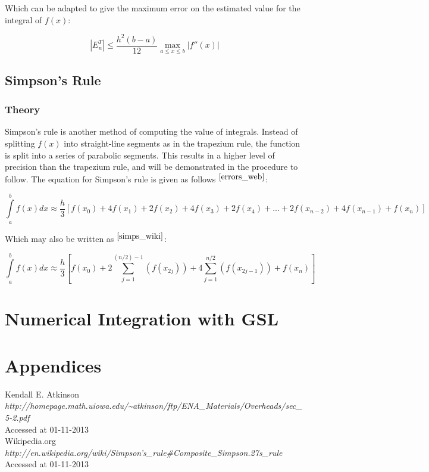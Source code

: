 \documentclass[pdf,color]{UoBnote}
\begin{document}
			Which can be adapted to give the maximum error on the estimated value for the integral of $f(x)$:
			
			\begin{equation} \label{eq:trap_err2}
				\left|E_n^T\right| \leq \frac{h^2\left(b-a\right)}{12}\max_{a \leq x \leq b}\left|f''(x)\right|
			\end{equation}
			
		\subsection{Simpson's Rule}
			\subsubsection{Theory}
				Simpson's rule is another method of computing the value of integrals. Instead of splitting $f(x)$ into straight-line segments as in the trapezium rule, the function is split into a
				series of parabolic segments. This results in a higher level of precision than the trapezium rule, and will be demonstrated in the procedure to follow. The equation for Simpson's rule is given as follows $^{\cite{errors_web}}$:
				
				\begin{equation} \label{simpsons}
					\int\limits_a^b f(x) dx \approx \frac{h}{3}\left[f(x_0) + 4f(x_1) + 2f(x_2) + 4f(x_3) + 2f(x_4) + ... + 2f(x_{n-2}) + 4f(x_{n-1}) +f(x_n)\right]
				\end{equation}
				
				Which may also be written as $^{\cite{simps_wiki}}$:
				
				
				\begin{equation} \label{simpsons_sum}
					\int\limits_a^b f(x) dx \approx \frac{h}{3}\left[f(x_0) + 2 \sum\limits_{j=1}^{(n/2)-1} \left(f(x_{2j})\right) + 4 \sum\limits_{j=1}^{n/2} \left(f(x_{2j-1})\right) + f(x_n) \right]
				\end{equation}
				
				
\section{Numerical Integration with GSL}

\section{Appendices}

\begin{thebibliography}{breitestes Label}
	 Kendall E. Atkinson\\{\em http://homepage.math.uiowa.edu/\textasciitilde{}atkinson/ftp/ENA\_Materials/Overheads/sec\_5-2.pdf}\\Accessed at 01-11-2013\\
	 Wikipedia.org\\{\em http://en.wikipedia.org/wiki/Simpson's\_rule\#Composite\_Simpson.27s\_rule}\\Accessed at 01-11-2013
\end{thebibliography}
\end{document}
